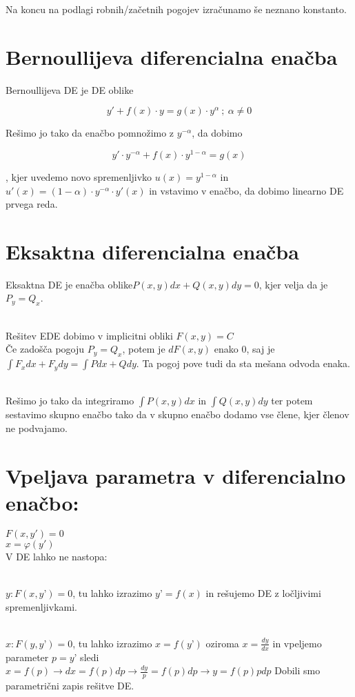 \documentclass[12pt]{report}
\begin{document}
Na koncu na podlagi robnih/začetnih pogojev izračunamo še neznano konstanto.

 


\section*{Bernoullijeva diferencialna enačba}

Bernoullijeva DE je DE oblike

\[
y'+f(x)\cdot y= g(x)\cdot y^\alpha\ ;\  \alpha \neq 0
\]

Rešimo jo tako da enačbo pomnožimo z $y^{-\alpha}$, da dobimo

\[
y'\cdot y^{-\alpha} + f(x) \cdot y^{1-\alpha}= g(x) 
\] 

, kjer uvedemo novo spremenljivko $u(x) =y^{1-\alpha} $ in $u'(x) = (1-\alpha)\cdot y^{-\alpha} \cdot y'(x)$ in vstavimo v enačbo, da dobimo linearno DE prvega reda.


\section*{Eksaktna diferencialna enačba}
Eksaktna DE je enačba oblike$P(x,y)dx+Q(x,y)dy = 0$, kjer velja da je $P_y=Q_x$.\\\

Rešitev EDE dobimo v implicitni obliki
$F(x,y) = C$\\
Če zadošča pogoju $P_y=Q_x$, potem je $dF(x,y)$ enako 0, saj je $\int F_xdx+F_ydy=\int Pdx + Qdy$. Ta pogoj pove tudi da sta mešana odvoda enaka.\\\


Rešimo jo tako da integriramo $\int P(x,y) dx$  in $\int Q(x,y) dy$ ter potem sestavimo skupno enačbo tako da v skupno enačbo dodamo vse člene, kjer členov ne podvajamo.



\section*{Vpeljava parametra v diferencialno enačbo:}

$F(x,y')=0$\\
$x=\varphi(y')$\\
V DE lahko ne nastopa:\\\

$y : F(x,y’) = 0$, tu lahko izrazimo $y’ = f(x)$ in rešujemo DE z ločljivimi spremenljivkami.\\\

$x : F(y,y’) = 0$, tu lahko izrazimo $x = f(y’)$  oziroma $x = \frac{dy}{dx}$ in vpeljemo parameter $p = y’$
sledi $x = f(p) \rightarrow dx = f(p) dp \rightarrow \frac{dy}{p} = f(p) dp \rightarrow y = f(p) p dp$
	Dobili smo parametrični zapis rešitve DE.
\end{document}
